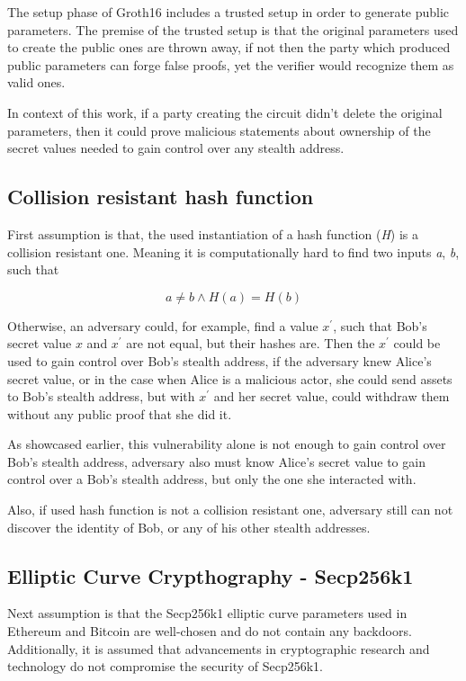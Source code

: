 The setup phase of Groth16 \cite{Groth16} includes a trusted setup in order to generate
public parameters. The premise of the trusted setup is that the original parameters
used to create the public ones are thrown away, if not then the party which
produced public parameters can forge false proofs, yet the verifier would
recognize them as valid ones.

In context of this work, if a party creating the circuit didn't delete the
original parameters, then it could prove malicious statements about ownership
of the secret values needed to gain control over any stealth address.

\subsection{Collision resistant hash function}\label{crhf}

First assumption is that, the used instantiation of a hash function (\textit{H})
is a collision resistant one. Meaning it is computationally hard to find two
inputs \textit{a}, \textit{b}, such that

\[ a \neq b \land H(a) = H(b) \]

Otherwise, an adversary could, for example, find a value $x^\prime$,
such that Bob's secret value $x$ and $x^\prime$ are not equal, but their hashes
are. Then the $x^\prime$ could be used to gain control over Bob's stealth address,
if the adversary knew Alice's secret value, or in the case when Alice is a malicious
actor, she could send assets to Bob's stealth address, but with $x^\prime$ and
her secret value, could withdraw them without any public proof that she did it.

As showcased earlier, this vulnerability alone is not enough to gain control
over Bob's stealth address, adversary also must know Alice's secret value to
gain control over a Bob's stealth address, but only the one she interacted with.

Also, if used hash function is not a collision resistant one, adversary still can not
discover the identity of Bob, or any of his other stealth addresses.

\subsection{Elliptic Curve Crypthography - Secp256k1}

Next assumption is that the Secp256k1 elliptic curve parameters used in Ethereum
and Bitcoin \cite{bitcoinSecp256k1Bitcoin} are well-chosen and do not contain any backdoors. Additionally, it is
assumed that advancements in cryptographic research and technology do not
compromise the security of Secp256k1.

